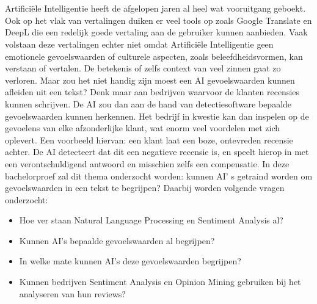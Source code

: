 
\chapter{}
\label{ch:inleiding}

Artificiële Intelligentie heeft de afgelopen jaren al heel wat vooruitgang geboekt. Ook op het vlak van vertalingen duiken er veel tools op zoals Google Translate en DeepL die een redelijk goede vertaling aan de gebruiker kunnen aanbieden. Vaak volstaan deze vertalingen echter niet omdat Artificiële Intelligentie geen emotionele gevoelswaarden of culturele aspecten, zoals beleefdheidsvormen, kan verstaan of vertalen. De betekenis of zelfs context van veel zinnen gaat zo verloren. Maar zou het niet handig zijn moest een AI gevoelswaarden kunnen afleiden uit een tekst? Denk maar aan bedrijven waarvoor de klanten recensies kunnen schrijven. De AI zou dan aan de hand van detectiesoftware bepaalde gevoelswaarden kunnen herkennen. Het bedrijf in kwestie kan dan inspelen op de gevoelens van elke afzonderlijke klant, wat enorm veel voordelen met zich oplevert.
Een voorbeeld hiervan: een klant laat een boze, ontevreden recensie achter. De AI detecteert dat dit een negatieve recensie is, en speelt hierop in met een verontschuldigend antwoord en misschien zelfs een compensatie.  
In deze bachelorproef zal dit thema onderzocht worden: kunnen AI' s getraind worden om gevoelswaarden in een tekst te begrijpen? Daarbij worden volgende vragen onderzocht:

\begin{itemize}
    \item Hoe ver staan Natural Language Processing en Sentiment Analysis al?
    \item Kunnen AI's bepaalde gevoelswaarden al begrijpen?
    \item In welke mate kunnen AI's deze gevoelswaarden begrijpen?
    \item Kunnen bedrijven Sentiment Analysis en Opinion Mining gebruiken bij het analyseren van hun reviews?
\end{itemize}


\section{}
\label{sec:probleemstelling}

